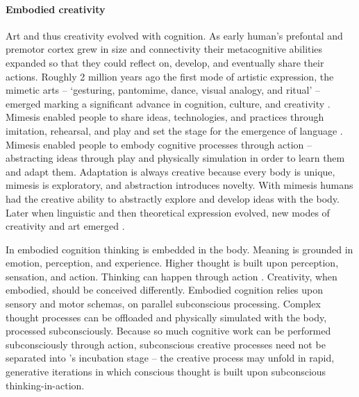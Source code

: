 \documentclass{article}
\begin{document}
\paragraph{Embodied creativity}
Art and thus creativity evolved with cognition.
As early human's prefontal and premotor cortex grew in size and connectivity 
their metacognitive abilities expanded 
so that they could reflect on, develop, and eventually share their actions.
%
Roughly 2 million years ago the first mode of artistic expression, the mimetic arts
 -- `gesturing, pantomime, dance, visual analogy, and ritual' -- emerged
marking a significant advance in cognition, culture, and creativity \citep{Donald2006}. 
Mimesis enabled people to share ideas, technologies, and practices through imitation, rehearsal, and play and set the stage for the emergence of language \citep{Donald2006}. 
%
Mimesis enabled people to embody cognitive processes through action -- 
abstracting ideas through play \citep{Deacon2006} and physically simulation \citep{Kirsh2013}
in order to learn them and adapt them. 
Adaptation is always creative because 
every body is unique,
mimesis is exploratory,
and abstraction introduces novelty. 
%
With mimesis humans had the creative ability to abstractly explore and develop ideas with the body. 
Later when linguistic and then theoretical expression evolved, new modes of creativity and art emerged \citep{Donald2006}. 

In embodied cognition thinking is embedded in the body. Meaning is grounded in emotion, perception, and experience.
Higher thought is built upon perception, sensation, and action. Thinking can happen through action \citep{Hardy-Vallee2008}. 
Creativity, when embodied, should be conceived differently. 
Embodied cognition relies upon sensory and motor schemas, on parallel subconscious processing. 
Complex thought processes can be offloaded and physically simulated with the body, processed subconsciously. 
Because so much cognitive work can be performed subconsciously through action, 
subconscious creative processes need not be separated into \citeauthor{Wallas1926}'s incubation stage -- 
the creative process may unfold in rapid, generative iterations in which conscious thought is built upon subconscious thinking-in-action.
\end{document}
